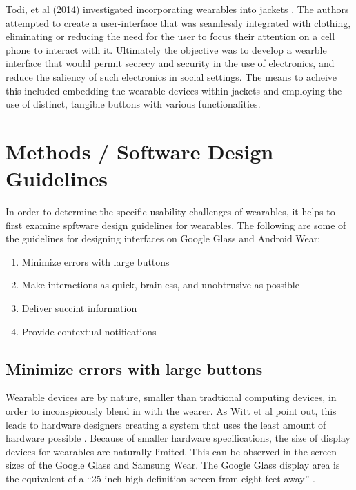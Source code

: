\documentclass[12pt]{article}
\begin{document}
Todi, et al (2014) investigated incorporating wearables into jackets \cite{todi}. The authors attempted to create a user-interface that was seamlessly integrated with clothing, eliminating or reducing the need for the user to focus their attention on a cell phone to interact with it. Ultimately the objective was to develop a wearble interface that would permit secrecy and security in the use of electronics, and reduce the saliency of such electronics in social settings.  The means to acheive this included embedding the wearable devices within jackets and employing the use of distinct, tangible buttons with various functionalities.

\section{Methods / Software Design Guidelines} 

In order to determine the specific usability challenges of wearables, it helps to first examine spftware design guidelines for wearables. The following are some of the guidelines for designing interfaces on Google Glass and Android Wear:

\begin{enumerate}
\item{Minimize errors with large buttons}
\item{Make interactions as quick, brainless, and unobtrusive as possible}
\item{Deliver succint information}
\item{Provide contextual notifications}
\end{enumerate}

\subsection{Minimize errors with large buttons}
Wearable devices are by nature, smaller than tradtional computing devices, in order to inconspicously blend in with the wearer. As Witt et al point out, this leads to hardware designers creating a system that uses the least amount of hardware possible \cite{witt}. Because of smaller hardware specifications, the size of display devices for wearables are naturally limited. This can be observed in the screen sizes of the Google Glass and Samsung Wear. The Google Glass display area is the equivalent of a ``25 inch high definition screen from eight feet away'' \cite{goog2}.
\end{document}
